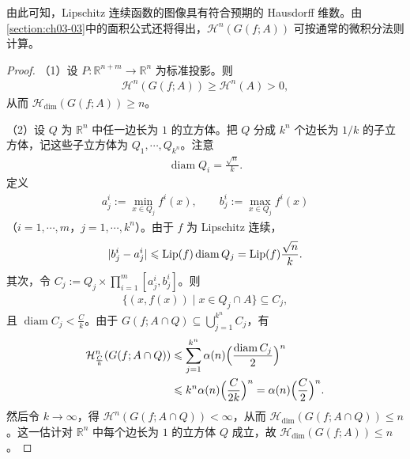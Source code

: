 \documentclass[../../main.tex]{subfiles}%
\begin{document}
\begin{remark}\label{remark:ch02-thm-2-9-期望维数}
由此可知，Lipschitz 连续函数的图像具有符合预期的 Hausdorff 维数。由\cref{section:ch03-03}中的面积公式还将得出，$\mathcal{H}^n(G(f;A))$ 可按通常的微积分法则计算。%
\end{remark}

\begin{proof}
（1）设 $P:\mathbb{R}^{n+m}\to\mathbb{R}^n$ 为标准投影。则
\begin{align*}
\mathcal{H}^n(G(f;A))\geqslant\mathcal{H}^n(A)>0 ,
\end{align*}
从而 $\mathcal{H}_{\dim}(G(f;A))\geqslant n$。

（2）设 $Q$ 为 $\mathbb{R}^n$ 中任一边长为 $1$ 的立方体。把 $Q$ 分成 $k^n$ 个边长为 $1/k$ 的子立方体，记这些子立方体为 $Q_1,\cdots,Q_{k^n}$。注意
\begin{align*}
\operatorname{diam}Q_i=\frac{\sqrt{n}}{k}.
\end{align*}
定义
\begin{align*}
a_j^i:=\min_{x\in Q_j}f^i(x),\qquad b_j^i:=\max_{x\in Q_j}f^i(x)
\end{align*}
（$i=1,\cdots,m$，$j=1,\cdots,k^n$）。由于 $f$ 为 Lipschitz 连续，
\begin{align*}
\lvert b_j^i-a_j^i\rvert\leqslant\operatorname{Lip}(f)\operatorname{diam}Q_j=\operatorname{Lip}(f)\frac{\sqrt{n}}{k}.
\end{align*}
其次，令 $C_j:=Q_j\times\prod_{i=1}^{m}[a_j^i,b_j^i]$。则
\begin{align*}
\{(x,f(x))\mid x\in Q_j\cap A\}\subseteq C_j ,
\end{align*}
且 $\operatorname{diam}C_j<\frac{C}{k}$。由于 $G(f;A\cap Q)\subseteq\bigcup_{j=1}^{k^n}C_j$，有
\begin{align*}
\mathcal{H}^n_{\frac{C}{k}}(G(f;A\cap Q))
&\leqslant\sum_{j=1}^{k^n}\alpha(n)\Bigl(\frac{\operatorname{diam}C_j}{2}\Bigr)^n\\
&\leqslant k^n\alpha(n)\Bigl(\frac{C}{2k}\Bigr)^n=\alpha(n)\Bigl(\frac{C}{2}\Bigr)^n .
\end{align*}
然后令 $k\to\infty$，得 $\mathcal{H}^n(G(f;A\cap Q))<\infty$，从而 $\mathcal{H}_{\dim}(G(f;A\cap Q))\leqslant n$。这一估计对 $\mathbb{R}^n$ 中每个边长为 $1$ 的立方体 $Q$ 成立，故 $\mathcal{H}_{\dim}(G(f;A))\leqslant n$。
\end{proof}
\end{document}
